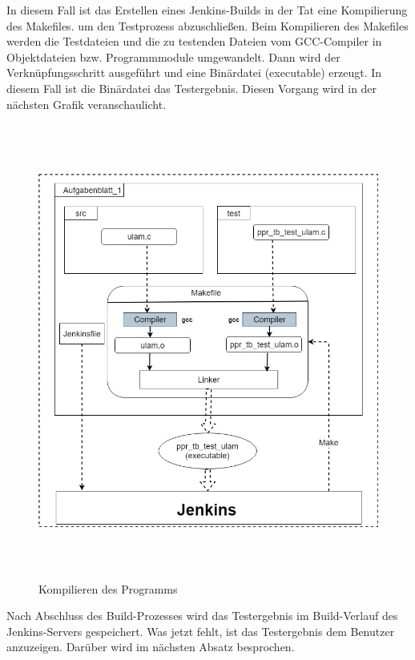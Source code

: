 \documentclass[a4paper,12pt,oneside]{book}
\begin{document}
\newline
In diesem Fall ist das Erstellen eines Jenkins-Builds in der Tat eine Kompilierung des Makefiles. um den Testprozess abzuschließen.
\newline
Beim Kompilieren des Makefiles werden die Testdateien und die zu testenden Dateien vom GCC-Compiler in Objektdateien bzw. Programmmodule umgewandelt. Dann wird der Verknüpfungsschritt ausgeführt und eine Binärdatei (executable) erzeugt. In diesem Fall ist die Binärdatei das Testergebnis. Diesen Vorgang wird in der nächsten Grafik veranschaulicht.
\begin{figure}[h!]
	\begin{center}
		\includegraphics[width=14cm, height=15cm]{Makefile.jpg}
		\caption{Kompilieren des Programms} 
		\label{Kompilieren des Programms} 
	\end{center}
\end{figure}
\newline
Nach Abschluss des Build-Prozesses wird das Testergebnis im Build-Verlauf des Jenkins-Servers gespeichert. Was jetzt fehlt, ist das Testergebnis dem Benutzer anzuzeigen. Darüber wird im nächsten Absatz besprochen.
\end{document}

